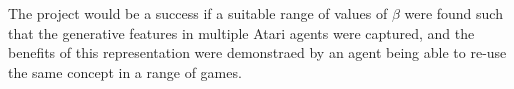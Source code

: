 \documentclass[12pt,twoside]{article}
\begin{document}
The project would be a success if a suitable range of values of $\beta$ were found such that the generative features in multiple Atari agents were captured, and the benefits of this representation were demonstraed by an agent being able to re-use the same concept in a range of games.

\newpage

\end{document}
